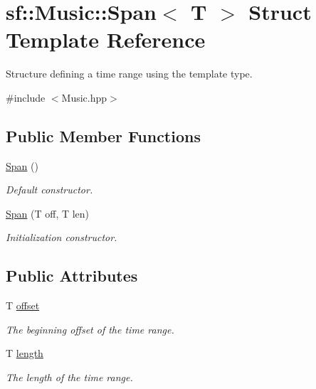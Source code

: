 \hypertarget{structsf_1_1_music_1_1_span}{}\section{sf\+:\+:Music\+:\+:Span$<$ T $>$ Struct Template Reference}
\label{structsf_1_1_music_1_1_span}


Structure defining a time range using the template type.  




{\ttfamily \#include $<$Music.\+hpp$>$}

\subsection*{Public Member Functions}
\begin{DoxyCompactItemize}
\item 
\mbox{\hyperlink{structsf_1_1_music_1_1_span_a71e6200a586f650ce002e7e99929ae85}{Span}} ()
\begin{DoxyCompactList}\small\item\em Default constructor. \end{DoxyCompactList}\item 
\mbox{\hyperlink{structsf_1_1_music_1_1_span_a935db12207fa3da4c2461cd5e1f9fa0d}{Span}} (T off, T len)
\begin{DoxyCompactList}\small\item\em Initialization constructor. \end{DoxyCompactList}\end{DoxyCompactItemize}
\subsection*{Public Attributes}
\begin{DoxyCompactItemize}
\item 
\mbox{\label{structsf_1_1_music_1_1_span_a49bb6a3c4239288cf47c1298c3e5e1a3}} 
T \mbox{\hyperlink{structsf_1_1_music_1_1_span_a49bb6a3c4239288cf47c1298c3e5e1a3}{offset}}
\begin{DoxyCompactList}\small\item\em The beginning offset of the time range. \end{DoxyCompactList}\item 
\mbox{\label{structsf_1_1_music_1_1_span_a509fdbef69a8fc0f8430ecb7b9e76221}} 
T \mbox{\hyperlink{structsf_1_1_music_1_1_span_a509fdbef69a8fc0f8430ecb7b9e76221}{length}}
\begin{DoxyCompactList}\small\item\em The length of the time range. \end{DoxyCompactList}\end{DoxyCompactItemize}


